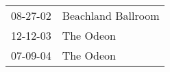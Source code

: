 \begin{supertabular}{p{0.07\textwidth}p{0.23\textwidth}}
 08-27-02 &  Beachland Ballroom \\
 12-12-03 &           The Odeon \\
 07-09-04 &           The Odeon \\
\end{supertabular}
